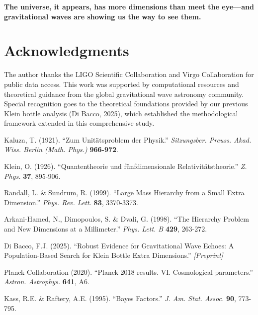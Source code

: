 \documentclass[11pt,a4paper]{article}
\begin{document}
\textbf{The universe, it appears, has more dimensions than meet the eye—and gravitational waves are showing us the way to see them.}

\section*{Acknowledgments}

The author thanks the LIGO Scientific Collaboration and Virgo Collaboration for public data access. This work was supported by computational resources and theoretical guidance from the global gravitational wave astronomy community. Special recognition goes to the theoretical foundations provided by our previous Klein bottle analysis (Di Bacco, 2025), which established the methodological framework extended in this comprehensive study.

\begin{thebibliography}{20}

Kaluza, T. (1921). ``Zum Unitätsproblem der Physik.'' \textit{Sitzungsber. Preuss. Akad. Wiss. Berlin (Math. Phys.)} \textbf{966-972}.

Klein, O. (1926). ``Quantentheorie und fünfdimensionale Relativitätstheorie.'' \textit{Z. Phys.} \textbf{37}, 895-906.

Randall, L. \& Sundrum, R. (1999). ``Large Mass Hierarchy from a Small Extra Dimension.'' \textit{Phys. Rev. Lett.} \textbf{83}, 3370-3373.

Arkani-Hamed, N., Dimopoulos, S. \& Dvali, G. (1998). ``The Hierarchy Problem and New Dimensions at a Millimeter.'' \textit{Phys. Lett. B} \textbf{429}, 263-272.

Di Bacco, F.J. (2025). ``Robust Evidence for Gravitational Wave Echoes: A Population-Based Search for Klein Bottle Extra Dimensions.'' \textit{[Preprint]}

Planck Collaboration (2020). ``Planck 2018 results. VI. Cosmological parameters.'' \textit{Astron. Astrophys.} \textbf{641}, A6.

Kass, R.E. \& Raftery, A.E. (1995). ``Bayes Factors.'' \textit{J. Am. Stat. Assoc.} \textbf{90}, 773-795.

\end{thebibliography}
\end{document}
